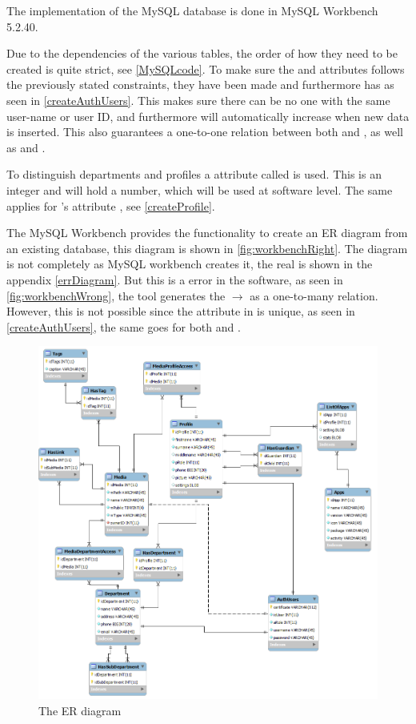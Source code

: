 The implementation of the MySQL database is done in MySQL Workbench 5.2.40.

Due to the dependencies of the various tables, the order of how they need to be created is quite strict, see \autoref{MySQLcode}. 
To make sure the  and  attributes follows the previously stated constraints, they have been made  and  furthermore has  as seen in \autoref{createAuthUsers}. 
This makes sure there can be no one with the same user-name or user ID, and furthermore  will automatically increase when new data is inserted. 
This also guarantees a one-to-one relation between both  and , as well as  and . 

To distinguish departments and profiles a attribute called  is used. 
This is an integer and will hold a number, which will be used at software level. The same applies for 's attribute , see \autoref{createProfile}.

The MySQL Workbench provides the functionality to create an ER diagram from an existing database, this diagram is shown in \autoref{fig:workbenchRight}. The diagram is not completely as MySQL workbench creates it, the real is shown in the appendix \autoref{errDiagram}. But this is a error in the software, as seen in \autoref{fig:workbenchWrong}, the tool generates the $\rightarrow$ as a one-to-many relation. However, this is not possible since the  attribute in  is unique, as seen in \autoref{createAuthUsers}, the same goes for both  and .

\begin{figure}
	\centering
		\includegraphics[width=1.00\textwidth]{images/workbenchRight.png}
	\caption{The ER diagram}
	\label{fig:workbenchRight}
\end{figure}

